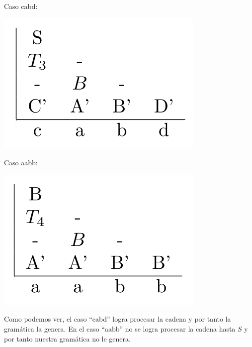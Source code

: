 
\begin{multicols}{2}
Caso cabd:
\begin{center}
\includegraphics[scale=0.30]{./cabd.png}
\end{center}

Caso aabb:
\begin{center}
\includegraphics[scale=0.30]{./aabb.png}
\end{center}
\end{multicols}

Como podemos ver, el caso ``cabd'' logra procesar la cadena y por tanto la gramática la genera.
En el caso ``aabb'' no se logra procesar la cadena hasta $S$ y por tanto nuestra gramática no le genera.
